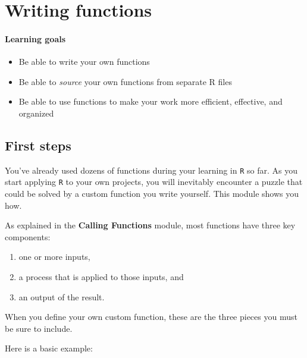 \documentclass[
]{book}
\providecommand{\tightlist}{%
  \setlength{\itemsep}{0pt}\setlength{\parskip}{0pt}}
\begin{document}
\hypertarget{writing-functions}{%
\chapter{Writing functions}\label{writing-functions}}

\hypertarget{learning-goals-14}{%
\subsubsection*{Learning goals}\label{learning-goals-14}}

\begin{itemize}
\tightlist
\item
  Be able to write your own functions
\item
  Be able to \emph{source} your own functions from separate R files
\item
  Be able to use functions to make your work more efficient, effective, and organized
\end{itemize}

\hypertarget{first-steps}{%
\section*{First steps}\label{first-steps}}

You've already used dozens of functions during your learning in \texttt{R} so far. As you start applying \texttt{R} to your own projects, you will inevitably encounter a puzzle that could be solved by a custom function you write yourself. This module shows you how.

As explained in the \textbf{Calling Functions} module, most functions have three key components:

\begin{enumerate}
\def\labelenumi{(\arabic{enumi})}
\tightlist
\item
  one or more inputs,\\
\item
  a process that is applied to those inputs, and\\
\item
  an output of the result.
\end{enumerate}

When you define your own custom function, these are the three pieces you must be sure to include.

Here is a basic example:
\end{document}
